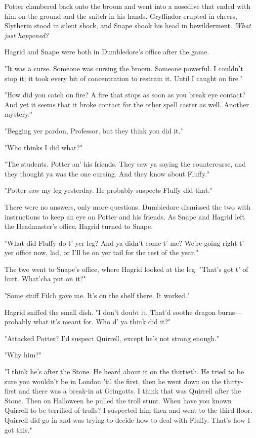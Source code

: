 Potter clambered back onto the broom and went into a nosedive that ended with him on the ground and the snitch in his hands. Gryffindor erupted in cheers, Slytherin stood in silent shock, and Snape shook his head in bewilderment. \emph{What just happened?}

Hagrid and Snape were both in Dumbledore's office after the game.

"It was a curse. Someone was cursing the broom. Someone powerful. I couldn't stop it; it took every bit of concentration to restrain it. Until I caught on fire."

"How did you catch on fire? A fire that stops as soon as you break eye contact? And yet it seems that it broke contact for the other spell caster as well. Another mystery."

"Begging yer pardon, Professor, but they think you did it."

"Who thinks I did what?"

"The students. Potter an' his friends. They saw ya saying the countercurse, and they thought ya was the one cursing. And they know about Fluffy."

"Potter saw my leg yesterday. He probably suspects Fluffy did that."

There were no answers, only more questions. Dumbledore dismissed the two with instructions to keep an eye on Potter and his friends. As Snape and Hagrid left the Headmaster's office, Hagrid turned to Snape.

"What did Fluffy do t' yer leg? And ya didn't come t' me? We're going right t' yer office now, lad, or I'll be on yer tail for the rest of the year."

The two went to Snape's office, where Hagrid looked at the leg. "That's got t' of hurt. What'cha put on it?"

"Some stuff Filch gave me. It's on the shelf there. It worked."

Hagrid sniffed the small dish. "I don't doubt it. That'd soothe dragon burns—probably what it's meant for. Who d' ya think did it?"

"Attacked Potter? I'd suspect Quirrell, except he's not strong enough."

"Why him?"

"I think he's after the Stone. He heard about it on the thirtieth. He tried to be sure you wouldn't be in London 'til the first, then he went down on the thirty-first and there was a break-in at Gringotts. I think that was Quirrell after the Stone. Then on Halloween he pulled the troll stunt. When have you known Quirrell to be terrified of trolls? I suspected him then and went to the third floor. Quirrell did go in and was trying to decide how to deal with Fluffy. That's how I got this."

